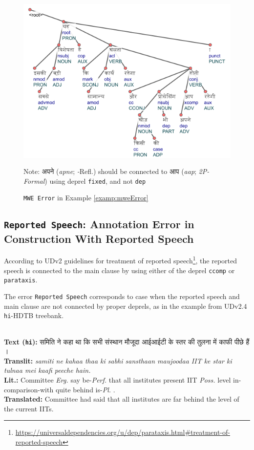 \begin{figure}[H]
    \centering
    \includegraphics[scale=0.90]{img/mweError.png}
    \caption{\texttt{MWE Error} in Example \ref{examp:mweError}}
    Note: \texthindi{अपने} (\textit{apne}; \textit-{Refl.}) should be connected to \texthindi{आप} (\textit{aap}; \textit{2P-Formal}) using deprel \texttt{fixed}, and not \texttt{dep}
    \label{examp:mweError-fig}
\end{figure}

\subsection[Annotation Error in Construction With Reported Speech: \texttt{Reported Speech}]{\texttt{Reported Speech}: Annotation Error in Construction With Reported Speech}

According to UDv2 guidelines for treatment of reported speech\footnote{\url{https://universaldependencies.org/u/dep/parataxis.html\#treatment-of-reported-speech}}, the reported speech is connected to the main clause by using either of the deprel \texttt{ccomp} or \texttt{parataxis}.

The error \texttt{Reported Speech} corresponds to case when the reported speech and main clause are not connected by proper deprels, as in the example from UDv2.4 \texttt{hi}-HDTB treebank.

\begin{example}
\label{examp:reportedSpeech}
\textbf{ }\\
\textbf{Text (\texttt{hi}):} \texthindi{समिति ने कहा था कि सभी संस्थान मौजूदा आईआईटी के स्तर की तुलना में काफी पीछे हैं ।}\\
\textbf{Translit:} \textit{samiti ne kahaa thaa ki sabhi sansthaan maujoodaa IIT ke star ki tulnaa mei kaafi peeche hain.}\\
\textbf{Lit.:} Committee \textit{Erg.} say be-\textit{Perf.} that all institutes present IIT \textit{Poss.} level in-comparison-with quite behind is-\textit{Pl.} . \\
\textbf{Translated:} Committee had said that all institutes are far behind the level of the current IITs. 
\end{example}

